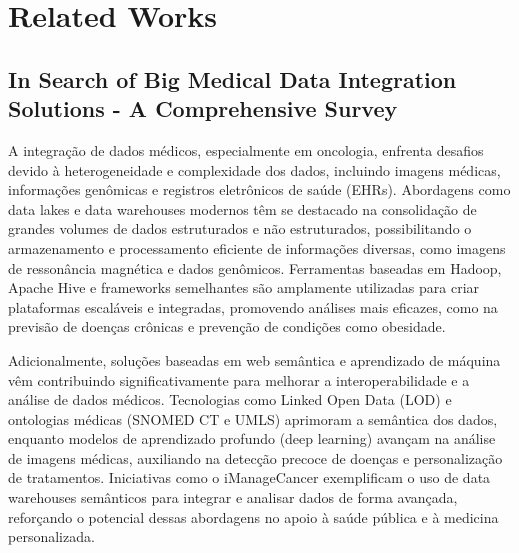 
\chapter[Related Works]{Related Works}


\section{In Search of Big Medical Data Integration Solutions - A Comprehensive Survey}
A integração de dados médicos, especialmente em oncologia, enfrenta desafios devido à heterogeneidade e complexidade dos dados, 
incluindo imagens médicas, informações genômicas e registros eletrônicos de saúde (EHRs). Abordagens como data lakes e data 
warehouses modernos têm se destacado na consolidação de grandes volumes de dados estruturados e não estruturados, possibilitando o
 armazenamento e processamento eficiente de informações diversas, como imagens de ressonância magnética e dados genômicos. Ferramentas 
 baseadas em Hadoop, Apache Hive e frameworks semelhantes são amplamente utilizadas para criar plataformas escaláveis e integradas, 
 promovendo análises mais eficazes, como na previsão de doenças crônicas e prevenção de condições como obesidade. \cite{dhayne2019}

Adicionalmente, soluções baseadas em web semântica e aprendizado de máquina vêm contribuindo significativamente para melhorar a 
interoperabilidade e a análise de dados médicos. Tecnologias como Linked Open Data (LOD) e ontologias médicas (SNOMED CT e UMLS) 
aprimoram a semântica dos dados, enquanto modelos de aprendizado profundo (deep learning) avançam na análise de imagens médicas, 
auxiliando na detecção precoce de doenças e personalização de tratamentos. Iniciativas como o iManageCancer exemplificam o uso de 
data warehouses semânticos para integrar e analisar dados de forma avançada, reforçando o potencial dessas abordagens no apoio à 
saúde pública e à medicina personalizada. \cite{dhayne2019}


